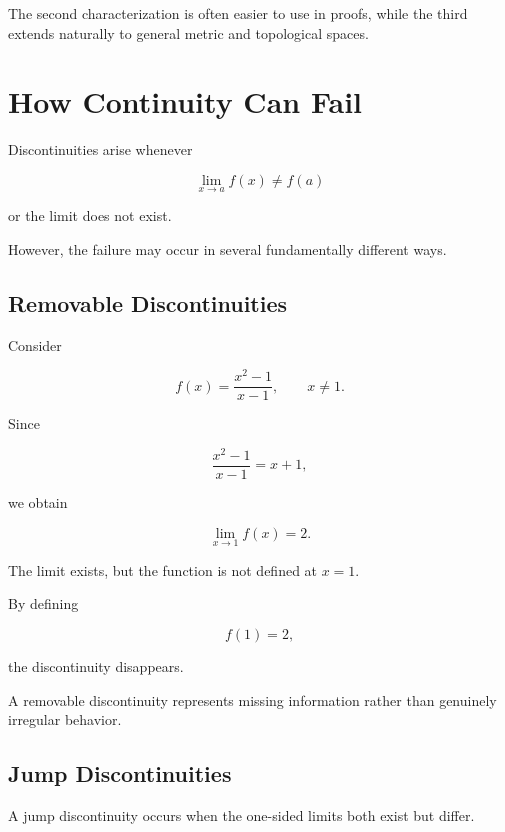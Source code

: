 \documentclass{essay}
\begin{document}
The second characterization is often easier to use in proofs, while the third
extends naturally to general metric and topological spaces.


\section{How Continuity Can Fail}

Discontinuities arise whenever

\[
\lim_{x\to a}f(x)\neq f(a)
\]

or the limit does not exist.

However, the failure may occur in several fundamentally different ways.


\subsection{Removable Discontinuities}

\begin{example}

Consider

\[
f(x)=\frac{x^2-1}{x-1},
\qquad x\neq1.
\]

Since

\[
\frac{x^2-1}{x-1}=x+1,
\]

we obtain

\[
\lim_{x\to1}f(x)=2.
\]

The limit exists, but the function is not defined at \(x=1\).

By defining

\[
f(1)=2,
\]

the discontinuity disappears.

\end{example}

A removable discontinuity represents missing information rather than genuinely
irregular behavior.


\subsection{Jump Discontinuities}

A jump discontinuity occurs when the one-sided limits both exist but differ.
\end{document}
